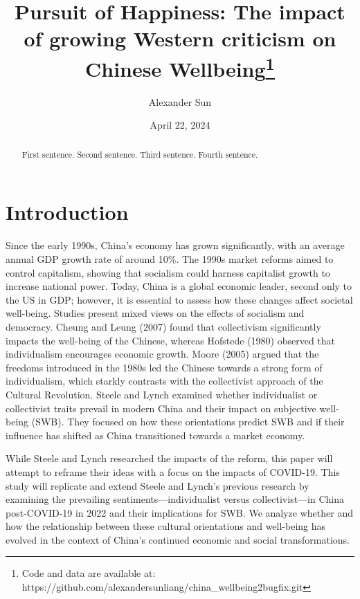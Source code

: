 \documentclass[
  letterpaper,
  DIV=11,
  numbers=noendperiod]{scrartcl}
\title{Pursuit of Happiness: The impact of growing Western criticism on
Chinese Wellbeing\thanks{Code and data are available at:
https://github.com/alexandersunliang/china\_wellbeing2bugfix.git}}
\author{Alexander Sun}
\date{April 22, 2024}
\renewcommand*\contentsname{Table of contents}
\newcommand\contentsname{Table of contents}
\begin{document}
\maketitle
\begin{abstract}
First sentence. Second sentence. Third sentence. Fourth sentence.
\end{abstract}
\ifdefined\Shaded\renewenvironment{Shaded}{\begin{tcolorbox}[borderline west={3pt}{0pt}{shadecolor}, frame hidden, sharp corners, enhanced, interior hidden, boxrule=0pt, breakable]}{\end{tcolorbox}}\fi

\renewcommand*\contentsname{Table of contents}
{
\hypersetup{linkcolor=}
\setcounter{tocdepth}{3}
\tableofcontents
}
\hypertarget{sec-intro}{%
\section{Introduction}\label{sec-intro}}

Since the early 1990s, China's economy has grown significantly, with an
average annual GDP growth rate of around 10\%. The 1990s market reforms
aimed to control capitalism, showing that socialism could harness
capitalist growth to increase national power. Today, China is a global
economic leader, second only to the US in GDP; however, it is essential
to assess how these changes affect societal well-being. Studies present
mixed views on the effects of socialism and democracy. Cheung and Leung
(2007) found that collectivism significantly impacts the well-being of
the Chinese, whereas Hofstede (1980) observed that individualism
encourages economic growth. Moore (2005) argued that the freedoms
introduced in the 1980s led the Chinese towards a strong form of
individualism, which starkly contrasts with the collectivist approach of
the Cultural Revolution. Steele and Lynch examined whether individualist
or collectivist traits prevail in modern China and their impact on
subjective well-being (SWB). They focused on how these orientations
predict SWB and if their influence has shifted as China transitioned
towards a market economy.

While Steele and Lynch researched the impacts of the reform, this paper
will attempt to reframe their ideas with a focus on the impacts of
COVID-19. This study will replicate and extend Steele and Lynch's
previous research by examining the prevailing sentiments---individualist
versus collectivist---in China post-COVID-19 in 2022 and their
implications for SWB. We analyze whether and how the relationship
between these cultural orientations and well-being has evolved in the
context of China's continued economic and social transformations.
\end{document}

